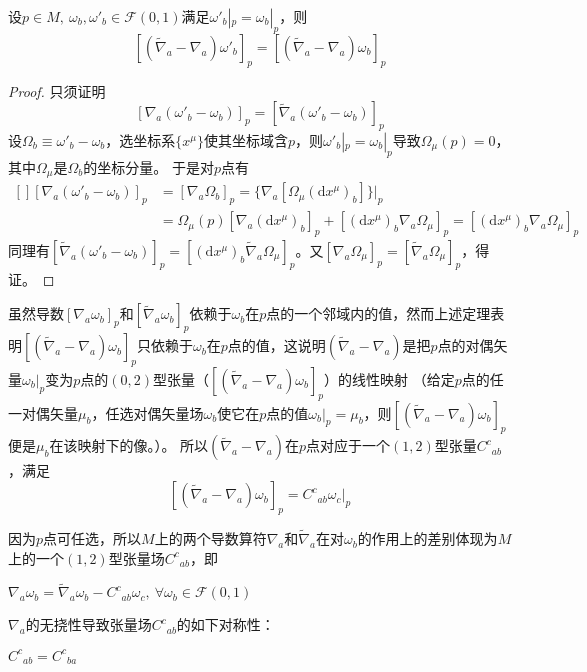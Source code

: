 \begin{theorem}
设$p \in M, ~ \omega_b, \omega'_b \in \mathscr{F}(0, 1)$满足$\omega'_b|_p = \omega_b|_p$，则
$$[(\tilde\nabla_a - \nabla_a)\omega'_b]_p = [(\tilde\nabla_a - \nabla_a)\omega_b]_p$$
\end{theorem}

\begin{proof}
只须证明
$$[\nabla_a(\omega'_b - \omega_b)]_p = [\tilde\nabla_a(\omega'_b - \omega_b)]_p$$
设$\Omega_b \equiv \omega'_b - \omega_b$，选坐标系$\{x^\mu\}$使其坐标域含$p$，则$\omega'_b|_p = \omega_b|_p$导致$\Omega_\mu(p) = 0$，其中$\Omega_\mu$是$\Omega_b$的坐标分量。
于是对$p$点有
$$\begin{aligned}[]
[\nabla_a(\omega'_b - \omega_b)]_p & = [\nabla_a\Omega_b]_p = \{\nabla_a[\Omega_\mu(\mathrm{d}x^\mu)_b]\}|_p \\
& = \Omega_\mu(p)[\nabla_a(\mathrm{d}x^\mu)_b]_p + [(\mathrm{d}x^\mu)_b\nabla_a\Omega_\mu]_p = [(\mathrm{d}x^\mu)_b\nabla_a\Omega_\mu]_p
\end{aligned}$$
同理有$[\tilde\nabla_a(\omega'_b - \omega_b)]_p = [(\mathrm{d}x^\mu)_b\tilde\nabla_a\Omega_\mu]_p$。又$[\nabla_a\Omega_\mu]_p = [\tilde\nabla_a\Omega_\mu]_p$，得证。
\end{proof}

虽然导数$[\nabla_a\omega_b]_p$和$[\tilde\nabla_a\omega_b]_p$依赖于$\omega_b$在$p$点的一个邻域内的值，然而上述定理表明$[(\tilde\nabla_a - \nabla_a)\omega_b]_p$只依赖于$\omega_b$在$p$点的值，这说明$(\tilde\nabla_a - \nabla_a)$是把$p$点的对偶矢量$\omega_b|_p$变为$p$点的$(0, 2)$型张量（$[(\tilde\nabla_a - \nabla_a)\omega_b]_p$）的线性映射
（给定$p$点的任一对偶矢量$\mu_b$，任选对偶矢量场$\omega_b$使它在$p$点的值$\omega_b|_p = \mu_b$，则$[(\tilde\nabla_a - \nabla_a)\omega_b]_p$便是$\mu_b$在该映射下的像。）。
所以$(\tilde\nabla_a - \nabla_a)$在$p$点对应于一个$(1, 2)$型张量$C^c{}_{ab}$，满足
$$[(\tilde\nabla_a - \nabla_a)\omega_b]_p = C^c{}_{ab}\omega_c|_p$$

因为$p$点可任选，所以$M$上的两个导数算符$\nabla_a$和$\tilde\nabla_a$在对$\omega_b$的作用上的差别体现为$M$上的一个$(1, 2)$型张量场$C^c{}_{ab}$，即
\begin{theorem}
$\nabla_a\omega_b = \tilde\nabla_a\omega_b - C^c{}_{ab}\omega_c, ~ \forall \omega_b \in \mathscr{F}(0, 1)$
\end{theorem}

$\nabla_a$的无挠性导致张量场$C^c{}_{ab}$的如下对称性：
\begin{theorem}
$C^c{}_{ab} = C^c{}_{ba}$
\end{theorem}

